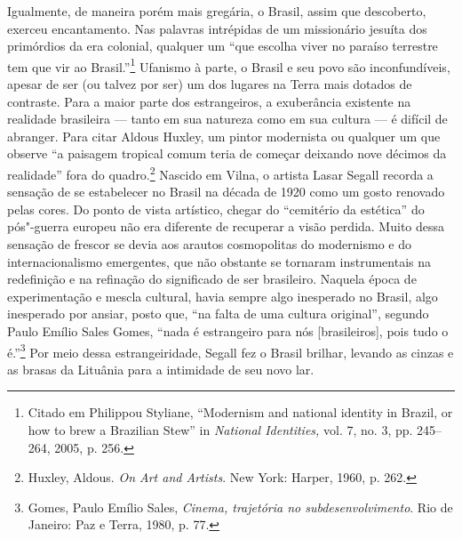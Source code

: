 Igualmente, de maneira porém mais gregária, o Brasil, assim que
descoberto, exerceu encantamento. Nas palavras intrépidas de um
missionário jesuíta dos primórdios da era colonial, qualquer um ``que
escolha viver no paraíso terrestre tem que vir ao Brasil.''\footnote{Citado
  em Philippou Styliane, ``Modernism and national identity in Brazil, or
  how to brew a Brazilian Stew'' in \emph{National Identities,} vol. 7,
  no. 3, pp. 245--264, 2005, p. 256.} Ufanismo à parte, o Brasil e seu
povo são inconfundíveis, apesar de ser (ou talvez por ser) um dos
lugares na Terra mais dotados de contraste. Para a maior parte dos
estrangeiros, a exuberância existente na realidade brasileira --- tanto em
sua natureza como em sua cultura --- é difícil de abranger. Para citar
Aldous Huxley, um pintor modernista ou qualquer um que observe ``a
paisagem tropical comum teria de começar deixando nove décimos da
realidade'' fora do quadro.\footnote{Huxley, Aldous. \emph{On Art and
  Artists}. New York: Harper, 1960, p. 262.} Nascido em Vilna, o artista
Lasar Segall recorda a sensação de se estabelecer no Brasil na década de
1920 como um gosto renovado pelas cores. Do ponto de vista artístico,
chegar do ``cemitério da estética'' do pós"-guerra europeu não era
diferente de recuperar a visão perdida. Muito dessa sensação de frescor
se devia aos arautos cosmopolitas do modernismo e do internacionalismo
emergentes, que não obstante se tornaram instrumentais na redefinição e
na refinação do significado de ser brasileiro. Naquela época de
experimentação e mescla cultural, havia sempre algo inesperado no
Brasil, algo inesperado por ansiar, posto que, ``na falta de uma cultura
original'', segundo Paulo Emílio Sales Gomes, ``nada é estrangeiro para
nós {[}brasileiros{]}, pois tudo o é.''\footnote{Gomes, Paulo Emílio
  Sales, \emph{Cinema, trajetória no subdesenvolvimento}. Rio de
  Janeiro: Paz e Terra, 1980, p. 77.} Por meio dessa estrangeiridade,
Segall fez o Brasil brilhar, levando as cinzas e as brasas da Lituânia
para a intimidade de seu novo lar.

